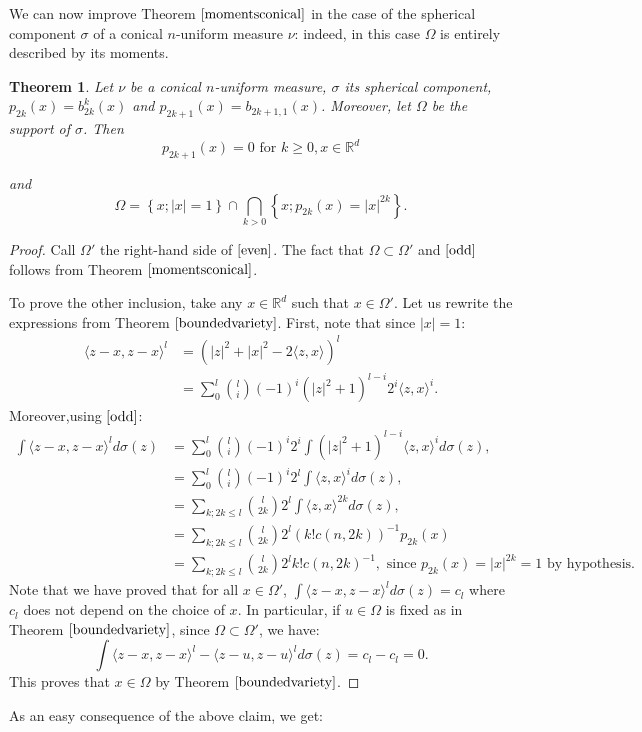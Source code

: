 \documentclass[11pt]{article}
\newtheorem{theorem}{Theorem}[section]
\theoremstyle{definition}
\theoremstyle{remark}
\numberwithin{equation}{section}
\begin{document}
We can now improve Theorem $\ref{momentsconical}$ in the case of the spherical component $\sigma$ of a conical $n$-uniform measure $\nu$: indeed, in this case $\Omega$ is entirely described by its moments.
\begin{theorem} \label{algVar}  Let $\nu$ be a conical $n$-uniform measure, $\sigma$ its spherical component, $p_{2k}(x)= b_{2k}^{k}(x)$ and $p_{2k+1}(x)= b_{2k+1,1}(x)$. Moreover, let $\Omega$ be the support of $\sigma$.
 Then \begin{equation}\label{odd}
 p_{2k+1}(x)=0 \text{ for } k \geq 0, x \in \mathbb{R}^d
\end{equation}
 
 and \begin{equation} \label{even}
 \Omega = \left\lbrace x; |x|=1 \right\rbrace \cap \bigcap_{k>0} \left\lbrace x; p_{2k}(x)=|x|^{2k} \right\rbrace.
 \end{equation}
 \end{theorem}
 \begin{proof}
 Call $\Omega'$ the right-hand side of $\eqref{even}$. The fact that $\Omega \subset \Omega'$ and $\eqref{odd}$ follows from Theorem $\ref{momentsconical}$.
  
 To prove the other inclusion, take any $x \in \mathbb{R}^d$ such that $x \in \Omega' $.
 Let us rewrite the expressions from Theorem $\ref{boundedvariety}$.
 First, note that since $|x|=1$: \begin{align*}
 \langle z-x,z-x \rangle ^{l}& =(|z|^2+|x|^2-2 \langle z,x \rangle )^{l} \\
                                  &=\sum_{0}^{l} \binom{l}{i} (-1)^{i} (|z|^2+1)^{l-i} 2^{i} \langle z,x \rangle ^{i}.
 \end{align*}
 Moreover,using $\eqref{odd}$:
 \begin{align*}
  \int \langle z-x,z-x \rangle ^{l} d\sigma(z) 
 &= \sum_{0}^{l} \binom{l}{i} (-1)^{i}  2^{i} \int (|z|^2+1)^{l-i}\langle z,x \rangle ^{i} d\sigma(z),\\
 &=\sum_{0}^{l} \binom{l}{i} (-1)^{i}  2^{l} \int \langle z,x \rangle ^{i} d\sigma(z), \\
 &=\sum_{k; 2k \leq l} \binom{l}{2k}   2^{l} \int \langle z,x \rangle ^{2k} d\sigma(z),\\
 &=\sum_{k; 2k \leq l} \binom{l}{2k}   2^{l}  (k! c(n,2k))^{-1} p_{2k}(x)\\
 &=\sum_{k; 2k \leq l} \binom{l}{2k}   2^{l}  {k! c(n,2k)}^{-1}, \mbox{    since }p_{2k}(x)=|x|^{2k}=1\mbox{ by hypothesis}.
          \end{align*}
Note that we have proved that for all $x  \in \Omega'$,  $\int \langle z-x,z-x \rangle ^{l} d\sigma(z)  = c_{l}$ where $c_l$ does not depend on the choice of $x$. In particular, if $u \in \Omega$ is fixed as in Theorem $\ref{boundedvariety}$, since $\Omega \subset \Omega'$, we have:
\begin{equation}
\int \langle z-x,z-x \rangle ^{l} - \langle z-u,z-u \rangle ^{l} d\sigma(z)= c_{l}-c_{l} =0. 
\end{equation}
This proves that $x \in \Omega$ by Theorem $\ref{boundedvariety}$.

 \end{proof}
 As an easy consequence of the above claim, we get:
 
\end{document}
